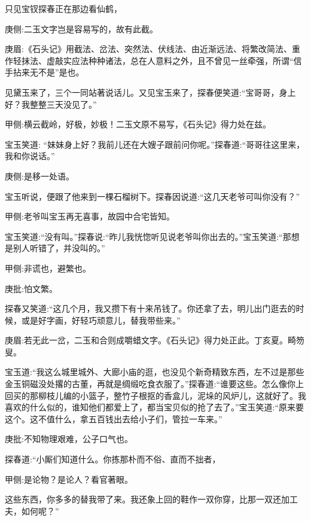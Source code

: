 \begin{parag}
    只见宝钗探春正在那边看仙鹤，\begin{note}庚侧:二玉文字岂是容易写的，故有此截。\end{note}\begin{note}庚眉:《石头记》用截法、岔法、突然法、伏线法、由近渐远法、将繁改简法、重作轻抹法、虚敲实应法种种诸法，总在人意料之外，且不曾见一丝牵强，所谓“信手拈来无不是”是也。\end{note}见黛玉来了，三个一同站著说话儿。又见宝玉来了，探春便笑道:“宝哥哥，身上好？我整整三天没见了。”\begin{note}甲侧:横云截岭，好极，妙极！二玉文原不易写，《石头记》得力处在兹。\end{note}宝玉笑道: “妹妹身上好？我前儿还在大嫂子跟前问你呢。”探春道:“哥哥往这里来，我和你说话。”\begin{note}庚侧:是移一处语。\end{note}宝玉听说，便跟了他来到一棵石榴树下。探春因说道:“这几天老爷可叫你没有？”\begin{note}甲侧:老爷叫宝玉再无喜事，故园中合宅皆知。\end{note}宝玉笑道:“没有叫。”探春说:“昨儿我恍惚听见说老爷叫你出去的。”宝玉笑道:“那想是别人听错了，并没叫的。”\begin{note}甲侧:非谎也，避繁也。\end{note}\begin{note}庚批:怕文繁。\end{note}探春又笑道:“这几个月，我又攒下有十来吊钱了。你还拿了去，明儿出门逛去的时候，或是好字画，好轻巧顽意儿，替我带些来。”\begin{note}庚眉:若无此一岔，二玉和合则成嚼蜡文字。《石头记》得力处正此。丁亥夏。畸笏叟。\end{note}宝玉道:“我这么城里城外、大廊小庙的逛，也没见个新奇精致东西，左不过是那些金玉铜磁没处撂的古董，再就是绸缎吃食衣服了。”探春道:“谁要这些。怎么像你上回买的那柳枝儿编的小篮子，整竹子根抠的香盒儿，泥垛的风炉儿，这就好了。我喜欢的什么似的，谁知他们都爱上了，都当宝贝似的抢了去了。”宝玉笑道:“原来要这个。这不值什么，拿五百钱出去给小子们，管拉一车来。”\begin{note}庚批:不知物理艰难，公子口气也。\end{note}探春道:“小厮们知道什么。你拣那朴而不俗、直而不拙者，\begin{note}甲侧:是论物？是论人？看官著眼。\end{note}这些东西，你多多的替我带了来。我还象上回的鞋作一双你穿，比那一双还加工夫，如何呢？”
\end{parag}


